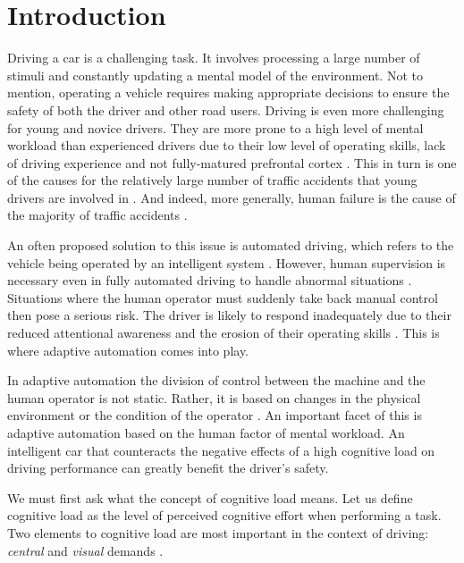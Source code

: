 
\section{Introduction}\label{sec:introduction}

Driving a car is a challenging task. 
It involves processing a large number of stimuli and constantly updating a mental model of the environment.
Not to mention, operating a vehicle requires making appropriate decisions to ensure the safety of both the driver and other road users.
Driving is even more challenging for young and novice drivers. 
They are more prone to a high level of mental workload than experienced drivers due to their low level of operating skills, lack of driving experience \citep{Gregersen1996} and not fully-matured prefrontal cortex \citep{Ross2014}.
This in turn is one of the causes for the relatively large number of traffic accidents that young drivers are involved in \citep{Sena2013}.
And indeed, more generally, human failure is the cause of the majority of traffic accidents \citep{DeWaard1996}.

An often proposed solution to this issue is automated driving, which refers to the vehicle being operated by an intelligent system \citep{Cabrall2018}.
However, human supervision is necessary even in fully automated driving to handle abnormal situations \citep{Brookhuis2007}.
Situations where the human operator must suddenly take back manual control then pose a serious risk.
The driver is likely to respond inadequately due to their reduced attentional awareness and the erosion of their operating skills \citep{Dijksterhuis2012}.
This is where adaptive automation comes into play.

In adaptive automation the division of control between the machine and the human operator is not static.
Rather, it is based on changes in the physical environment or the condition of the operator \citep{Sheridan2011}.
An important facet of this is adaptive automation based on the human factor of mental workload.
An intelligent car that counteracts the negative effects of a high cognitive load on driving performance can greatly benefit the driver's safety.

We must first ask what the concept of cognitive load means.
Let us define cognitive load as the level of perceived cognitive effort when performing a task.
Two elements to cognitive load are most important in the context of driving: \textit{central} and \textit{visual} demands \citep{DeWaard1996}. 

